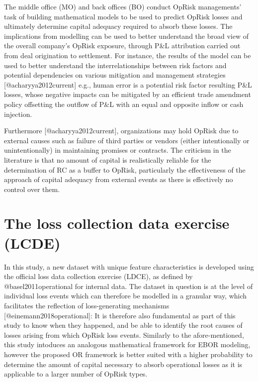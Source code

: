 \documentclass[]{article}
\begin{document}
The middle office (MO) and back offices (BO) conduct OpRisk managements'
task of building mathematical models to be used to predict OpRisk losses
and ultimately determine capital adequacy required to absorb these
losses. The implications from modelling can be used to better understand
the broad view of the overall company's OpRisk exposure, through P\&L
attribution carried out from deal origination to settlement. For
instance, the results of the model can be used to better understand the
interrelationships between risk factors and potential dependencies on
various mitigation and management strategies {[}@acharyya2012current{]}
e.g., human error is a potential risk factor resulting P\&L losses,
whose negative impacts can be mitigated by an efficient trade amendment
policy offsetting the outflow of P\&L with an equal and opposite inflow
or cash injection.\medskip

Furthermore {[}@acharyya2012current{]}, organizations may hold OpRisk
due to external causes such as failure of third parties or vendors
(either intentionally or unintentionally) in maintaining promises or
contracts. The criticism in the literature is that no amount of capital
is realistically reliable for the determination of RC as a buffer to
OpRisk, particularly the effectiveness of the approach of capital
adequacy from external events as there is effectively no control over
them.\medskip

\section{The loss collection data exercise (LCDE)}
\label{sec:The loss collection data exercise (LCDE)}

In this study, a new dataset with unique feature characteristics is
developed using the official loss data collection exercise (LDCE), as
defined by @basel2011operational for internal data. The dataset in
question is at the level of individual loss events which can therefore
be modelled in a granular way, which facilitates the reflection of
loss-generating mechanisms {[}@einemann2018operational{]}: It is
therefore also fundamental as part of this study to know when they
happened, and be able to identify the root causes of losses arising from
which OpRisk loss events. Similarly to the afore-mentioned, this study
intoduces an analogous mathematical framework for EBOR modeling, however
the proposed OR framework is better suited with a higher probability to
determine the amount of capital necessary to absorb operational losses
as it is applicable to a larger number of OpRisk types.\medskip
\end{document}
